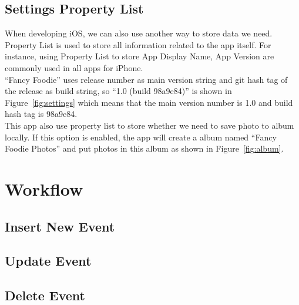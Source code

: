 
\subsection{Settings Property List} %
\label{sub:settings_list}

	When developing iOS, we can also use another way to store data we need. Property List is used to store all information related to the app itself. For instance, using Property List to store App Display Name, App Version are commonly used in all apps for iPhone. \\
	
	``Fancy Foodie'' uses release number as main version string and git hash tag of the release as build string, so ``1.0 (build 98a9e84)'' is shown in Figure~\ref{fig:settings} which means that the main version number is 1.0 and build hash tag is 98a9e84. \\
	 
	 This app also use property list to store whether we need to save photo to album locally. If this option is enabled, the app will create a album  named ``Fancy Foodie Photos'' and put photos in this album as shown in Figure~\ref{fig:album}.
	 
 	 
\newpage

\section{Workflow} %
\label{sec:work_overflow}

\subsection{Insert New Event} %
\label{sub:insert_new_event}


\subsection{Update Event} %
\label{sub:update_event}


\subsection{Delete Event} %
\label{sub:delete_event}

